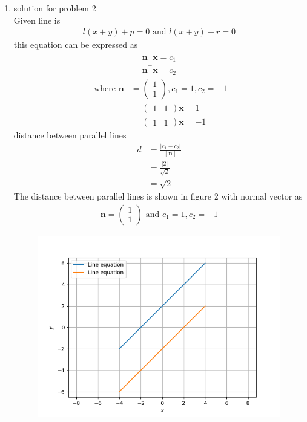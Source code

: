 \documentclass[12pt]{article}
\providecommand{\abs}[1]{\left\vert#1\right\vert}
\providecommand{\norm}[1]{\left\lVert#1\right\rVert}
\newcommand{\myvec}[1]{\ensuremath{\begin{pmatrix}#1\end{pmatrix}}}
\let\vec\mathbf
\begin{document}
\begin{enumerate}
\begin{figure}[h!]
\begin{center}
\end{center}
\caption{}
\label{fig:Fig1}
\end{figure}
	\item solution for problem 2
	\\
Given line is 
\begin{align}
l(x+y)+p=0\text{ and }l(x+y)-r=0
\end{align}
this equation can be expressed as 
\begin{align}
\vec{n}^{\top}\vec{x}=c_1\\
\vec{n}^{\top}\vec{x}=c_2
\end{align}
\begin{align}
\text{ where }
\vec{n}& = \myvec{1\\1},c_1=1,c_2=-1\\
& =\myvec{1&1}\vec{x}=1\\ 
& =\myvec{1&1}\vec{x}=-1		
\end{align}
distance between parallel lines 
\begin{align}
d&=\frac{\abs{c_1-c_2}}{\norm{\vec{n}}}\\
&=\frac{\abs{2}}{\sqrt{2}}\\
&=\sqrt{2}
\end{align}	
The distance between parallel lines 
is shown in figure 2  with normal vector as 
\begin{align*}
\vec{n} =\myvec{1\\1} \text{ and }c_1=1,c_2=-1
\end{align*}
\begin{figure}[h!]
\begin{center}
\includegraphics[width=\columnwidth]{para1.png}
\end{center}
\caption{}
\label{fig:Fig2}
\end{figure}
\end{enumerate}
\end{document}

